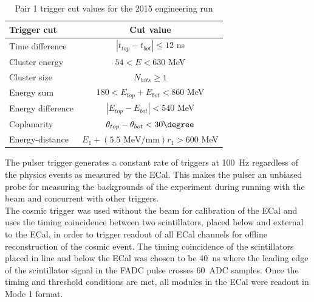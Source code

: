 \begin{table}[htb]
\caption{Pair 1 trigger cut values for the 2015 engineering run}
\label{tab:pairTriggerVals}
\centering
\begin{tabular}{lc}
\toprule
Trigger cut & Cut value \\
\midrule
Time difference & $| t_{top}-t_{bot} | \leq12$ ns   \\
Cluster energy & $54<E<630$ MeV \\
Cluster size & $N_{hits}\geq 1$\\
Energy sum & $180<E_{top}+E_{bot}<860$ MeV\\
Energy difference & $| E_{top}-E_{bot}|<540$ MeV\\
Coplanarity & $\theta_{top}-\theta_{bot}<30\degree $\\
Energy-distance & $E_{1}+(5.5 \textrm{ MeV/mm})r_{1}>600$ MeV\\ 
\bottomrule
\end{tabular}
\end{table}
\indent The pulser trigger generates a constant rate of triggers at 100~Hz regardless of the physics events as measured by the ECal. This makes the pulser an unbiased probe for measuring the backgrounds of the experiment during running with the beam and concurrent with other triggers.\\ 
\indent The cosmic trigger was used without the beam for calibration of the ECal and uses the timing coincidence between two scintillators, placed below and external to the ECal, in order to trigger readout of all ECal channels for offline reconstruction of the cosmic event. The timing coincidence of the scintillators placed in line and below the ECal was chosen to be 40~ns where the leading edge of the scintillator signal in the FADC pulse crosses 60~ADC samples. Once the timing and threshold conditions are met, all modules in the ECal were readout in Mode 1 format. 

